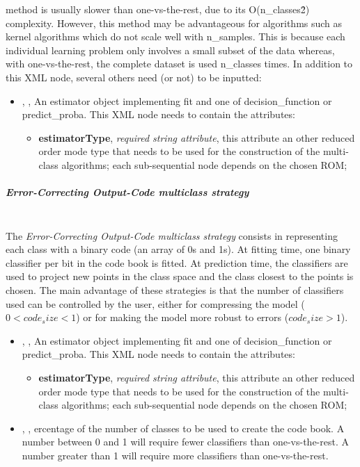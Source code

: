 method is usually slower than one-vs-the-rest, due to its O(n\_classes\^2)
complexity.
%
However, this method may be advantageous for algorithms such as kernel
algorithms which do not scale well with n\_samples.
%
This is because each individual learning problem only involves a small subset of
the data whereas, with one-vs-the-rest, the complete dataset is used n\_classes
times.
%
%
In addition to this XML node, several others need (or not) to be inputted:
\begin{itemize}
  \item {}, ,
  An estimator object implementing fit and one of decision\_function or
  predict\_proba.
  This XML node needs to contain the attributes:
  \vspace{-5mm}
  \begin{itemize}
    \itemsep0em
    \item \textbf{estimatorType}, \textit{required string attribute}, this
    attribute an other reduced order mode type that needs to be used for the
    construction of the multi-class algorithms; each sub-sequential node depends
    on the chosen ROM;
  \end{itemize}
\end{itemize}
\subparagraph{Error-Correcting Output-Code multiclass strategy}
\mbox{}
\\The \textit{Error-Correcting Output-Code multiclass strategy} consists in
representing each class with a binary code (an array of 0s and 1s).
%
At fitting time, one binary classifier per bit in the code book is fitted.
%
At prediction time, the classifiers are used to project new points in the class
space and the class closest to the points is chosen.
%
The main advantage of these strategies is that the number of classifiers used
can be controlled by the user, either for compressing the model ($0 < code_size
< 1$) or for making the model more robust to errors ($code_size > 1$).
%
\begin{itemize}
  \item {}, ,
  An estimator object implementing fit and one of decision\_function or
  predict\_proba.
  This XML node needs to contain the attributes:
  \vspace{-5mm}
\begin{itemize}
    \itemsep0em
    \item \textbf{estimatorType}, \textit{required string attribute}, this
    attribute an other reduced order mode type that needs to be used for the
    construction of the multi-class algorithms; each sub-sequential node depends
    on the chosen ROM;
\end{itemize}
  \item {}, ,
  ercentage of the number of classes to be used to create the code book.
  A number between 0 and 1 will require fewer classifiers than one-vs-the-rest.
  A number greater than 1 will require more classifiers than one-vs-the-rest.
\end{itemize}
